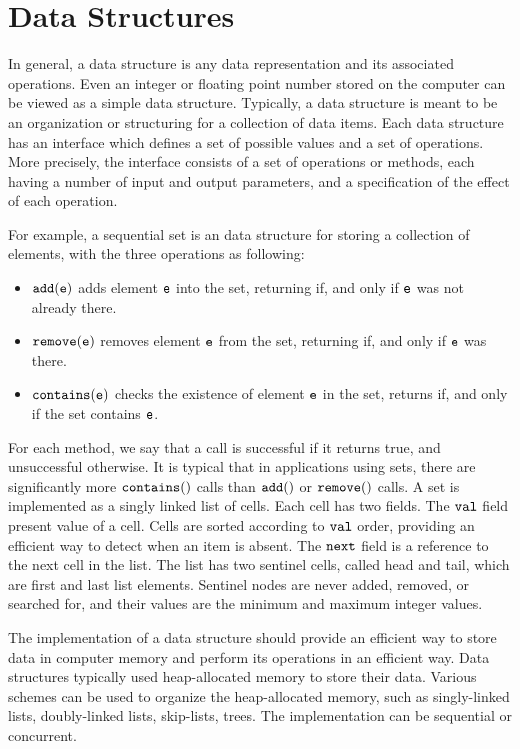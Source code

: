  
\chapter{Data Structures}
In general, a data structure is any data representation and its
associated operations. Even an integer or floating point number stored on the computer can be viewed as a simple data structure. Typically, a data structure is meant to be an organization or structuring for a collection of data items. 
 Each data structure has an interface which defines a set of possible values and a set of operations. More precisely, the interface consists of a set of operations or methods, each having a number of input and output parameters, and a specification of the effect of each operation. 

For example,  a sequential set is an data structure for storing a collection of elements, with the three operations as following: 
\begin{itemize}
\item $\tt add(e)$ adds element $\tt e$ into the set, returning \true\; if, and only if $\tt e$ was not
already there. 
\item $\tt remove(e)$ removes element $\tt e$ from the set, returning \true\; if, and only if
$\tt e$ was there. 
\item $\tt contains(e)$ checks the existence of element $\tt e$ in the set, returns \true\; if, and only if the set contains $\tt e$. 
\end{itemize}
For each method, we say that a call is successful if it returns true, and unsuccessful
otherwise. It is typical that in applications using sets, there are significantly more
$\tt contains()$ calls than $\tt add()$ or $\tt remove()$ calls.
A set is implemented as a singly linked list of cells. Each cell has two fields. The $\tt val$ field present value of a cell. Cells are sorted according to $\tt val$ order, providing an efficient way to detect when an item is absent. The $\tt next$ field is a reference to
the next cell in the list. The list has two sentinel cells, called head and tail, which are first and last list elements. Sentinel nodes are never added, removed, or searched for, and their values are the minimum and maximum integer values.

The implementation of a data structure should provide
an efficient way to store data in computer memory and perform its operations
in an efficient way. Data structures
typically used heap-allocated memory to store their data. Various schemes
can be used to organize the heap-allocated memory, such as singly-linked lists,
doubly-linked lists, skip-lists, trees. The implementation
can be sequential or concurrent.

